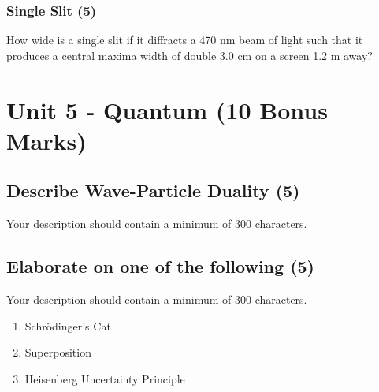 \documentclass{article}
\begin{document}
\subsubsection{Single Slit (5)}
How wide is a single slit if it diffracts a 470 nm beam of light such that it produces a central maxima width of double 3.0 cm on a screen 1.2 m away?\\

\section{Unit 5 - Quantum (10 Bonus Marks)}
\subsection{Describe Wave-Particle Duality (5)}
Your description should contain a minimum of 300 characters.

\subsection{Elaborate on one of the following (5)}
Your description should contain a minimum of 300 characters.
\begin{enumerate}[label=\alph*)]
    \item Schrödinger's Cat
    \item Superposition
    \item Heisenberg Uncertainty Principle
\end{enumerate}\leavevmode\\
\end{document}
